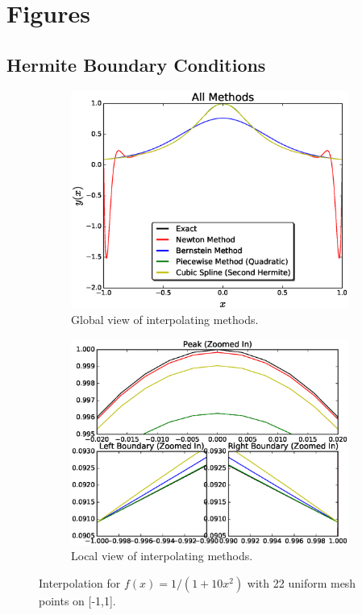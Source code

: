 \documentclass[12pt]{article}
\theoremstyle{remark}
\begin{document}
\section{Figures} 

\subsection{Hermite Boundary Conditions}

\begin{figure}[H]
	\centering
	\begin{subfigure}{.5\textwidth}
		\centering
		\includegraphics[width=1.1\linewidth]{fig1.eps}
		\caption{Global view of interpolating methods.}
		\label{fig:sub1}
	\end{subfigure}%
	\begin{subfigure}{.5\textwidth}
		\centering
		\includegraphics[width=1.1\linewidth]{subFig1.eps}
		\caption{Local view of interpolating methods.}
		\label{fig:sub2}
	\end{subfigure}
	\caption{Interpolation for $f(x) = 1/(1+10x^2)$ with 22 uniform mesh points on [-1,1].}
	\label{fig:test}
\end{figure}
\end{document}
